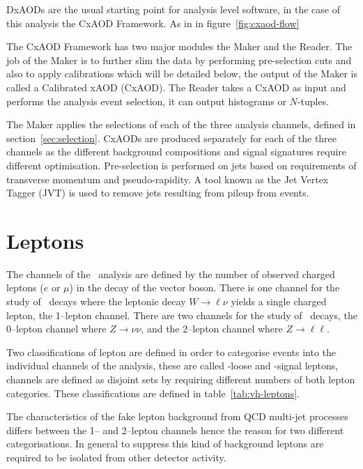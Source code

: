 DxAODs are the usual starting point for analysis level software, in the case of
this analysis the CxAOD Framework. As in in figure~\ref{fig:cxaod-flow}

The CxAOD Framework has two major modules the Maker and the Reader. The job of
the Maker is to further slim the data by performing pre-selection cuts and also
to apply calibrations which will be detailed below, the output of the Maker is
called a Calibrated xAOD (CxAOD). The Reader takes a CxAOD as input and performs
the analysis event selection, it can output histograms or $N$-tuples.

The Maker applies the selections of each of the three analysis channels, defined
in section~\ref{sec:selection}. CxAODs are produced separately for each of the
three channels as the different background compositions and signal signatures
require different optimisation. Pre-selection is performed on jets based on
requirements of transverse momentum and pseudo-rapidity. A tool known as the Jet
Vertex Tagger (JVT) is used to remove jets resulting from pileup from events.

\section{Leptons}%
\label{sec:lepton}

The channels of the \VHbb\ analysis are defined by the number of
observed charged leptons ($e$ or $\mu$) in the decay of the vector boson. There
is one channel for the study of \WHbb\ decays where the leptonic
decay $W \rightarrow \ell\nu$ yields a single charged lepton, the 1--lepton
channel. There are two channels for the study of \ZHbb\ decays, the
0--lepton channel where $Z \rightarrow \nu\nu$, and the 2--lepton channel where
$Z \rightarrow \ell\ell$.

Two classifications of lepton are defined in order to categorise events into the
individual channels of the analysis, these are called \VH-loose and \VH-signal
leptons, channels are defined as disjoint sets by requiring different numbers of
both lepton categories. These classifications are defined in
table~\ref{tab:vh-leptons}.

The characteristics of the fake lepton background from QCD multi-jet processes
differs between the 1-- and 2--lepton channels hence the reason for two
different categorisations. In general to suppress this kind of background
leptons are required to be isolated from other detector activity.

